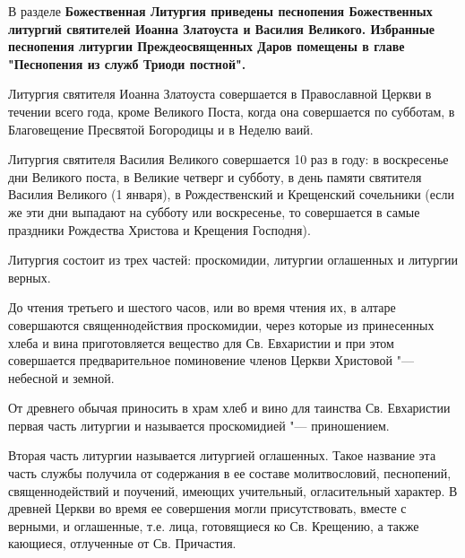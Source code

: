 




В разделе \bfseries  Божественная Литургия\normalfont{} приведены песнопения Божественных литургий святителей Иоанна Златоуста и Василия Великого. Избранные песнопения литургии Преждеосвященных Даров помещены в главе "Песнопения из служб Триоди постной".


Литургия святителя Иоанна Златоуста совершается в Православной Церкви в течении всего года, кроме Великого Поста, когда она совершается по субботам, в Благовещение Пресвятой Богородицы и в Неделю ваий.


Литургия святителя Василия Великого совершается 10 раз в году: в воскресенье дни Великого поста, в Великие четверг и субботу, в день памяти святителя Василия Великого (1 января), в Рождественский и Крещенский сочельники (если же эти дни выпадают на субботу или воскресенье, то совершается в самые праздники Рождества Христова и Крещения Господня).

Литургия состоит из трех частей: проскомидии, литургии оглашенных и литургии верных.
 

 


До чтения третьего и шестого часов, или во время чтения их, в алтаре совершаются священнодействия проскомидии, через которые из принесенных хлеба и вина приготовляется вещество для Св. Евхаристии и при этом совершается предварительное поминовение членов Церкви Христовой "--- небесной и земной.


От древнего обычая приносить в храм хлеб и вино для таинства Св. Евхаристии первая часть литургии и называется проскомидией "--- приношением.


\mychapterending

 


Вторая часть литургии называется литургией оглашенных. Такое название эта часть службы получила от содержания в ее составе молитвословий, песнопений, священнодействий и поучений, имеющих учительный, огласительный характер. В древней Церкви во время ее совершения могли присутствовать, вместе с верными, и оглашенные, т.е. лица, готовящиеся ко Св. Крещению, а также кающиеся, отлученные от Св. Причастия.


